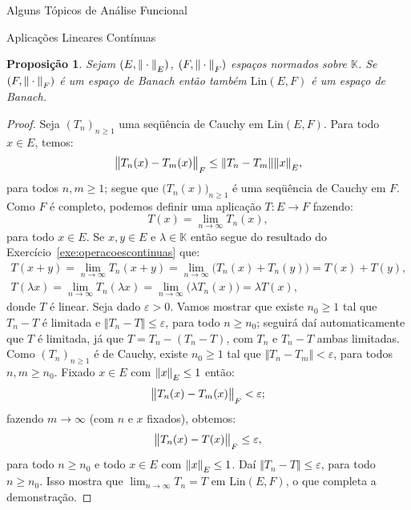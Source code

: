 \documentclass[oneside,final,11pt]{amsbook}
\newcommand{\K}{\mathds K}
\newcommand{\Lin}{\mathrm{Lin}}
\newcommand{\norma}[2]{\Vert#1\Vert_{\lower2pt\hbox{$\scriptstyle#2$}}}
\newcommand{\bignorma}[2]{\big\Vert#1\big\Vert_{\lower2pt\hbox{$\scriptstyle#2$}}}
\theoremstyle{remark}\newtheorem{exercise}{Exercício}[chapter]
\theoremstyle{remark}\newtheorem{*exercise}[exercise]{\hbox to 0pt{\hskip 0pt minus 1fil*}Exercício}
\theoremstyle{definition}\newtheorem{exdefin}{Definição}[chapter]
\theoremstyle{plain}\newtheorem{teo}{Teorema}[section]
\theoremstyle{plain}\newtheorem{lem}[teo]{Lema}
\theoremstyle{plain}\newtheorem{prop}[teo]{Proposição}
\theoremstyle{plain}\newtheorem{cor}[teo]{Corolário}
\theoremstyle{definition}\newtheorem{defin}[teo]{Definição}
\theoremstyle{remark}\newtheorem{rem}[teo]{Observação}
\theoremstyle{definition}\newtheorem{notation}[teo]{Notação}
\theoremstyle{definition}\newtheorem{convention}[teo]{Convenção}
\theoremstyle{definition}\newtheorem{example}[teo]{Exemplo}
\numberwithin{section}{chapter}
\numberwithin{equation}{section}
\begin{document}
\begin{chapter}{Alguns Tópicos de Análise Funcional}
\begin{section}{Aplicações Lineares Contínuas}
\begin{prop}\label{thm:LinBanach}
Sejam $(E,\norma\cdot E)$, $(F,\norma\cdot F)$ espaços normados sobre $\K$. Se $(F,\norma\cdot F)$
é um espaço de Banach então também $\Lin(E,F)$ é um espaço de Banach.
\end{prop}
\begin{proof}
Seja $(T_n)_{n\ge1}$ uma seqüência de Cauchy em $\Lin(E,F)$. Para todo $x\in E$, temos:
\[\bignorma{T_n(x)-T_m(x)}F\le\Vert T_n-T_m\Vert\norma xE,\]
para todos $n,m\ge1$; segue que $\big(T_n(x)\big)_{n\ge1}$ é uma seqüência de Cauchy em $F$.
Como $F$ é completo, podemos definir uma aplicação $T:E\to F$ fazendo:
\[T(x)=\lim_{n\to\infty}T_n(x),\]
para todo $x\in E$. Se $x,y\in E$ e $\lambda\in\K$ então segue do resultado
do Exercício~\ref{exe:operacoescontinuas} que:
\begin{gather*}
T(x+y)=\lim_{n\to\infty}T_n(x+y)=\lim_{n\to\infty}\big(T_n(x)+T_n(y)\big)=T(x)+T(y),\\
T(\lambda x)=\lim_{n\to\infty}T_n(\lambda x)=\lim_{n\to\infty}\big(\lambda T_n(x)\big)
=\lambda T(x),
\end{gather*}
donde $T$ é linear. Seja dado $\varepsilon>0$. Vamos mostrar que existe $n_0\ge1$ tal que
$T_n-T$ é limitada e $\Vert T_n-T\Vert\le\varepsilon$, para todo $n\ge n_0$; seguirá
daí automaticamente que $T$ é limitada, já que $T=T_n-(T_n-T)$, com $T_n$ e $T_n-T$
ambas limitadas. Como $(T_n)_{n\ge1}$ é de Cauchy, existe $n_0\ge1$ tal que
$\Vert T_n-T_m\Vert<\varepsilon$, para todos $n,m\ge n_0$. Fixado $x\in E$
com $\norma xE\le1$ então:
\[\bignorma{T_n(x)-T_m(x)}F<\varepsilon;\]
fazendo $m\to\infty$ (com $n$ e $x$ fixados), obtemos:
\[\bignorma{T_n(x)-T(x)}F\le\varepsilon,\]
para todo $n\ge n_0$ e todo $x\in E$ com $\norma xE\le1$. Daí
$\Vert T_n-T\Vert\le\varepsilon$, para todo $n\ge n_0$. Isso mostra que
$\lim_{n\to\infty}T_n=T$ em $\Lin(E,F)$, o que completa a demonstração.
\end{proof}


\end{section}
\end{chapter}
\end{document}
